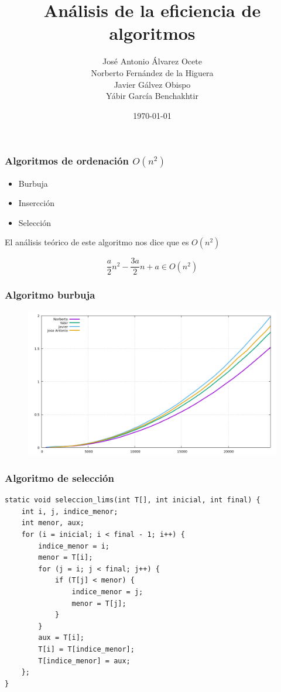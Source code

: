 \documentclass[spanish]{beamer}
\title{Análisis de la eficiencia de algoritmos}
\date{\today}
\author{José Antonio Álvarez Ocete \\ Norberto Fernández de la Higuera \\ Javier Gálvez Obispo \\ Yábir García Benchakhtir}
\institute{Doble Grado en Ingeniería Informática y Matemáticas}
\begin{document}
\frame{\titlepage}

\begin{frame}\frametitle{Algoritmos de ordenación $O(n^2)$}

  \begin{itemize}
  \item Burbuja
  \item Insercción
  \item Selección
  \end{itemize}
\end{frame}

\begin{frame}
  El análisis teórico de este algoritmo nos dice que es $O(n^2)$

  $$\frac{a}{2} n^2 - \frac{3a}{2} n + a \in O(n^2)$$
\end{frame}

\begin{frame}\frametitle{Algoritmo burbuja}
  \begin{figure}[H]
    \centering   
        \includegraphics[clip,width=1\columnwidth]{../plots/burbuja.png}%
    \end{figure}
  \end{frame}

  \begin{frame}[fragile]\frametitle{Algoritmo de selección}

    \begin{lstlisting}
static void seleccion_lims(int T[], int inicial, int final) {
	int i, j, indice_menor;
	int menor, aux;
	for (i = inicial; i < final - 1; i++) {
		indice_menor = i;
		menor = T[i];
		for (j = i; j < final; j++) {
			if (T[j] < menor) {
				indice_menor = j;
				menor = T[j];
			}
		}
		aux = T[i];
		T[i] = T[indice_menor];
		T[indice_menor] = aux;
	};
}
\end{lstlisting}
    
\end{frame}
\end{document}

